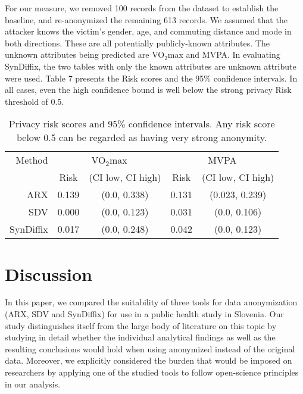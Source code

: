 \documentclass[10pt]{article}
\newcommand{\hlmay}[1]{#1}
\begin{document}
\hlmay{For our measure, we removed 100 records from the dataset to establish the baseline, and re-anonymized the remaining 613 records. We assumed that the attacker knows the victim's gender, age, and commuting distance and mode in both directions. These are all potentially publicly-known attributes. The unknown attributes being predicted are VO$_2$max and MVPA. In evaluating SynDiffix, the two tables with only the known attributes are unknown attribute were used. Table} 7 \hlmay{presents the Risk scores and the 95\% confidence intervals. In all cases, even the high confidence bound is well below the strong privacy Risk threshold of 0.5.}


\begin{table}
\begin{center}
\begin{small}
\begin{tabular}{rcccc}
\toprule
Method & \multicolumn{2}{c}{VO$_2$max} & \multicolumn{2}{c}{MVPA} \\ 
 & Risk & (CI low, CI high) & Risk & (CI low, CI high) \\ 
\midrule
ARX & 0.139 & (0.0, 0.338) & 0.131 & (0.023, 0.239) \\ 
SDV & 0.000 & (0.0, 0.123) & 0.031 & (0.0, 0.106) \\ 
SynDiffix & 0.017 & (0.0, 0.248) & 0.042 & (0.0, 0.123) \\ 
\bottomrule
\end{tabular}
\end{small}
\caption{Privacy risk scores and 95\% confidence intervals. Any risk score below 0.5 can be regarded as having very strong anonymity.}
\label{tab:risk_eval}
\end{center}
\end{table}


\section*{Discussion}

In this paper, we compared the suitability of three tools for data anonymization (ARX, SDV and SynDiffix) for use in a public health study in Slovenia. Our study distinguishes itself from the large body of literature on this topic by studying in detail whether the individual analytical findings as well as the resulting conclusions would hold when using anonymized instead of the original data. Moreover, we explicitly considered the burden that would be imposed on researchers by applying one of the studied tools to follow open-science principles in our analysis.
\end{document}
